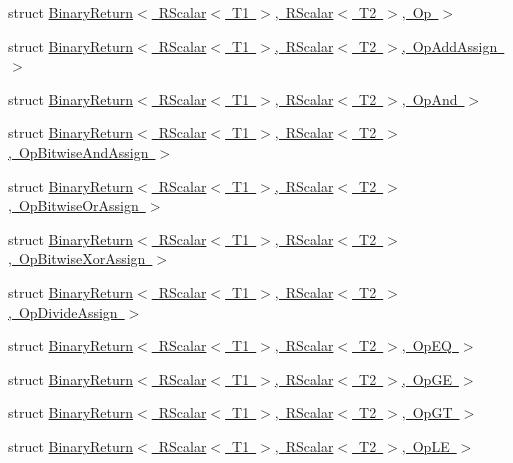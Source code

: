 \begin{DoxyCompactItemize}
\item 
struct \mbox{\hyperlink{structENSEM_1_1BinaryReturn_3_01RScalar_3_01T1_01_4_00_01RScalar_3_01T2_01_4_00_01Op_01_4}{Binary\+Return$<$ R\+Scalar$<$ T1 $>$, R\+Scalar$<$ T2 $>$, Op $>$}}
\item 
struct \mbox{\hyperlink{structENSEM_1_1BinaryReturn_3_01RScalar_3_01T1_01_4_00_01RScalar_3_01T2_01_4_00_01OpAddAssign_01_4}{Binary\+Return$<$ R\+Scalar$<$ T1 $>$, R\+Scalar$<$ T2 $>$, Op\+Add\+Assign $>$}}
\item 
struct \mbox{\hyperlink{structENSEM_1_1BinaryReturn_3_01RScalar_3_01T1_01_4_00_01RScalar_3_01T2_01_4_00_01OpAnd_01_4}{Binary\+Return$<$ R\+Scalar$<$ T1 $>$, R\+Scalar$<$ T2 $>$, Op\+And $>$}}
\item 
struct \mbox{\hyperlink{structENSEM_1_1BinaryReturn_3_01RScalar_3_01T1_01_4_00_01RScalar_3_01T2_01_4_00_01OpBitwiseAndAssign_01_4}{Binary\+Return$<$ R\+Scalar$<$ T1 $>$, R\+Scalar$<$ T2 $>$, Op\+Bitwise\+And\+Assign $>$}}
\item 
struct \mbox{\hyperlink{structENSEM_1_1BinaryReturn_3_01RScalar_3_01T1_01_4_00_01RScalar_3_01T2_01_4_00_01OpBitwiseOrAssign_01_4}{Binary\+Return$<$ R\+Scalar$<$ T1 $>$, R\+Scalar$<$ T2 $>$, Op\+Bitwise\+Or\+Assign $>$}}
\item 
struct \mbox{\hyperlink{structENSEM_1_1BinaryReturn_3_01RScalar_3_01T1_01_4_00_01RScalar_3_01T2_01_4_00_01OpBitwiseXorAssign_01_4}{Binary\+Return$<$ R\+Scalar$<$ T1 $>$, R\+Scalar$<$ T2 $>$, Op\+Bitwise\+Xor\+Assign $>$}}
\item 
struct \mbox{\hyperlink{structENSEM_1_1BinaryReturn_3_01RScalar_3_01T1_01_4_00_01RScalar_3_01T2_01_4_00_01OpDivideAssign_01_4}{Binary\+Return$<$ R\+Scalar$<$ T1 $>$, R\+Scalar$<$ T2 $>$, Op\+Divide\+Assign $>$}}
\item 
struct \mbox{\hyperlink{structENSEM_1_1BinaryReturn_3_01RScalar_3_01T1_01_4_00_01RScalar_3_01T2_01_4_00_01OpEQ_01_4}{Binary\+Return$<$ R\+Scalar$<$ T1 $>$, R\+Scalar$<$ T2 $>$, Op\+E\+Q $>$}}
\item 
struct \mbox{\hyperlink{structENSEM_1_1BinaryReturn_3_01RScalar_3_01T1_01_4_00_01RScalar_3_01T2_01_4_00_01OpGE_01_4}{Binary\+Return$<$ R\+Scalar$<$ T1 $>$, R\+Scalar$<$ T2 $>$, Op\+G\+E $>$}}
\item 
struct \mbox{\hyperlink{structENSEM_1_1BinaryReturn_3_01RScalar_3_01T1_01_4_00_01RScalar_3_01T2_01_4_00_01OpGT_01_4}{Binary\+Return$<$ R\+Scalar$<$ T1 $>$, R\+Scalar$<$ T2 $>$, Op\+G\+T $>$}}
\item 
struct \mbox{\hyperlink{structENSEM_1_1BinaryReturn_3_01RScalar_3_01T1_01_4_00_01RScalar_3_01T2_01_4_00_01OpLE_01_4}{Binary\+Return$<$ R\+Scalar$<$ T1 $>$, R\+Scalar$<$ T2 $>$, Op\+L\+E $>$}}

\end{DoxyCompactItemize}
